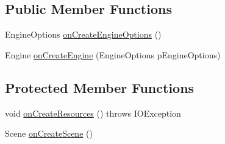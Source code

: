 \subsection*{Public Member Functions}
\begin{DoxyCompactItemize}
\item 
Engine\-Options \hyperlink{classcom_1_1tuukka_1_1fromscratch_1_1Main_ab6d1a0dfa642b3a770bba2a0ab398e8f}{on\-Create\-Engine\-Options} ()
\item 
Engine \hyperlink{classcom_1_1tuukka_1_1fromscratch_1_1Main_a657a41f97bb56332933b35a67fcfe879}{on\-Create\-Engine} (Engine\-Options p\-Engine\-Options)
\end{DoxyCompactItemize}
\subsection*{Protected Member Functions}
\begin{DoxyCompactItemize}
\item 
void \hyperlink{classcom_1_1tuukka_1_1fromscratch_1_1Main_ab018eb79e77d9dadef45f947a14d5625}{on\-Create\-Resources} ()  throws I\-O\-Exception 
\item 
Scene \hyperlink{classcom_1_1tuukka_1_1fromscratch_1_1Main_a3296880ced15a386337e05b3e7e00d5a}{on\-Create\-Scene} ()
\end{DoxyCompactItemize}


